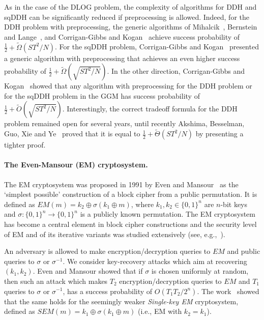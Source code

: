 \documentclass[11pt]{article}
\begin{document}
As in the case of the DLOG problem, the complexity of algorithms for DDH and sqDDH can be significantly reduced if preprocessing is allowed. Indeed, for the DDH problem with preprocessing, the generic algorithms of Mihalcik~\cite{Mih10}, Bernstein and Lange~\cite{BernsteinL13}, and Corrigan-Gibbs and Kogan~\cite{Corrigan-GibbsK18} achieve success probability of $\frac{1}{2}+\tilde{\Omega}(ST^2/N)$. For the sqDDH problem, Corrigan-Gibbs and Kogan~\cite{Corrigan-GibbsK18} presented a generic algorithm with preprocessing that achieves an even higher success probability of $\frac{1}{2}+\tilde{\Omega}(\sqrt{ST^2/N})$. In the other direction, Corrigan-Gibbs and Kogan~\cite{Corrigan-GibbsK18} showed that any algorithm with preprocessing for the DDH problem or for the sqDDH problem in the GGM has success probability of $\frac{1}{2}+\tilde{O}(\sqrt{ST^2/N})$. Interestingly, the correct tradeoff formula for the DDH problem remained open for several years, until recently Akshima, Besselman, Guo, Xie and Ye~\cite{AkshimaBGXY24} proved that it is equal to $\frac{1}{2}+ \tilde{\Theta}(ST^2/N)$ by presenting a tighter proof. 


\paragraph{The Even-Mansour (EM) cryptosystem.} The EM cryptosystem was proposed in 1991 by Even and Mansour~\cite{EvenM97} as the `simplest possible' construction of a block cipher from a public permutation. It is defined as $EM(m)=k_2 \oplus \sigma(k_1 \oplus m)$, where $k_1,k_2 \in \{0,1\}^n$ are $n$-bit keys and $\sigma:\{0,1\}^n \to \{0,1\}^n$ is a publicly known permutation. The EM cryptosystem has become a central element in block cipher constructions and the security level of EM and of its iterative variants was studied extensively (see, e.g.,~\cite{ChenLLSS18,CogliatiLS15,DaiSST17}). 

An adversary is allowed to make encryption/decryption queries to $EM$ and public queries to $\sigma$ or $\sigma^{-1}$.
We consider key-recovery attacks which aim at recovering $(k_1,k_2)$. Even and Mansour showed that if $\sigma$ is chosen uniformly at random, then such an attack which makes $T_2$ encryption/decryption queries to $EM$ and $T_1$ queries to $\sigma$ or $\sigma^{-1}$, has a success probability of $O(T_1 T_2 / 2^n)$. The work~\cite{DKS15} showed that the same holds for the seemingly weaker \emph{Single-key EM} cryptosystem, defined as $SEM(m)=k_1 \oplus \sigma(k_1 \oplus m)$ (i.e., EM with $k_2=k_1$).
\end{document}
